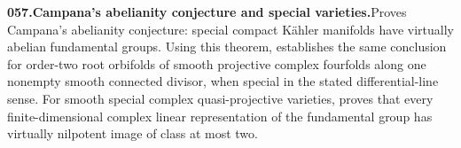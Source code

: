 \documentclass[11pt,a4paper]{article}
\begin{document}
  \par \begin{minipage}{\linewidth}
  \fontsize{10.5}{12.6}\selectfont\RaggedRight
  \hypertarget{result 057}{}
  {\bfseries\textcolor{muted}{057.}\enspace Campana's abelianity conjecture and special varieties.}\enspace Proves Campana's abelianity conjecture: special compact K\"ahler manifolds have virtually abelian fundamental groups. Using this theorem, establishes the same conclusion for order-two root orbifolds of smooth projective complex fourfolds along one nonempty smooth connected divisor, when special in the stated differential-line sense. For smooth special complex quasi-projective varieties, proves that every finite-dimensional complex linear representation of the fundamental group has virtually nilpotent image of class at most two.\par
  \end{minipage}\par\vspace{5pt}
\end{document}
